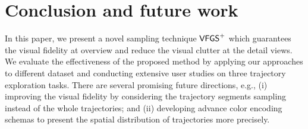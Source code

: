 \section{Conclusion and future work}\label{sec:con}
In this paper, we present a novel sampling {technique} $\mathsf{VFGS}^{+}$ which guarantees the visual fidelity at overview and reduce the visual clutter at the detail views.
We evaluate the effectiveness of the proposed method by applying our approaches to different dataset and conducting extensive user studies on three trajectory exploration tasks.
There are several promising future directions, e.g., (i) improving the visual fidelity by considering the trajectory segments sampling instead of the whole trajectories;
and (ii) developing advance color encoding schemas to present the spatial distribution of trajectories more precisely.

